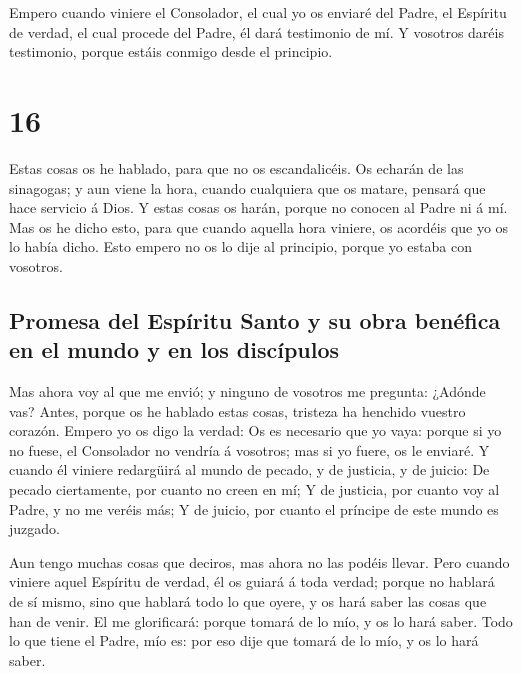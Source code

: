  Empero cuando viniere el Consolador, el cual yo os
enviaré del Padre, el Espíritu de verdad, el cual procede del Padre, él
dará testimonio de mí.  Y vosotros daréis testimonio,
porque estáis conmigo desde el principio.

\hypertarget{section-15}{%
\section{16}\label{section-15}}

 Estas cosas os he hablado, para que no os escandalicéis.
 Os echarán de las sinagogas; y aun viene la hora, cuando
cualquiera que os matare, pensará que hace servicio á Dios.
 Y estas cosas os harán, porque no conocen al Padre ni á
mí.  Mas os he dicho esto, para que cuando aquella hora
viniere, os acordéis que yo os lo había dicho. Esto empero no os lo dije
al principio, porque yo estaba con vosotros.

\hypertarget{promesa-del-espuxedritu-santo-y-su-obra-benuxe9fica-en-el-mundo-y-en-los-discuxedpulos}{%
\subsection{Promesa del Espíritu Santo y su obra benéfica en el mundo y
en los
discípulos}\label{promesa-del-espuxedritu-santo-y-su-obra-benuxe9fica-en-el-mundo-y-en-los-discuxedpulos}}

 Mas ahora voy al que me envió; y ninguno de vosotros me
pregunta: ¿Adónde vas?  Antes, porque os he hablado estas
cosas, tristeza ha henchido vuestro corazón.  Empero yo os
digo la verdad: Os es necesario que yo vaya: porque si yo no fuese, el
Consolador no vendría á vosotros; mas si yo fuere, os le enviaré.
 Y cuando él viniere redargüirá al mundo de pecado, y de
justicia, y de juicio:  De pecado ciertamente, por cuanto
no creen en mí;  Y de justicia, por cuanto voy al Padre,
y no me veréis más;  Y de juicio, por cuanto el príncipe
de este mundo es juzgado.

 Aun tengo muchas cosas que deciros, mas ahora no las
podéis llevar.  Pero cuando viniere aquel Espíritu de
verdad, él os guiará á toda verdad; porque no hablará de sí mismo, sino
que hablará todo lo que oyere, y os hará saber las cosas que han de
venir.  El me glorificará: porque tomará de lo mío, y os
lo hará saber.  Todo lo que tiene el Padre, mío es: por
eso dije que tomará de lo mío, y os lo hará saber.

